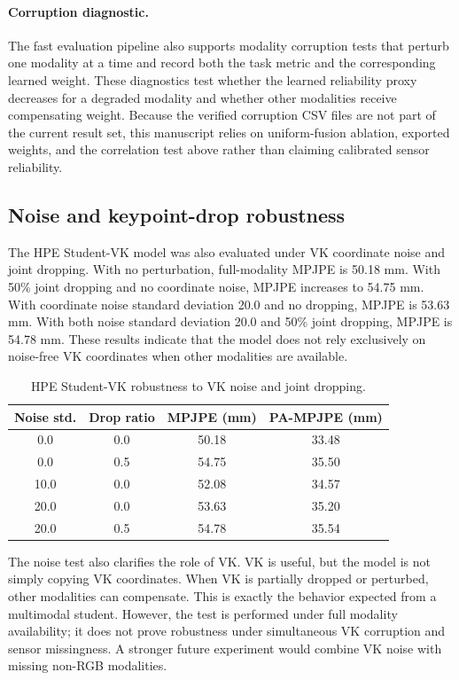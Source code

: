 \documentclass[preprint,12pt]{elsarticle}
\newcommand{\mpjpe}{MPJPE}
\newcommand{\pampjpe}{PA-MPJPE}
\begin{document}
\paragraph{Corruption diagnostic.}
The fast evaluation pipeline also supports modality corruption tests that perturb one modality at a time and record both the task metric and the corresponding learned weight. These diagnostics test whether the learned reliability proxy decreases for a degraded modality and whether other modalities receive compensating weight. Because the verified corruption CSV files are not part of the current result set, this manuscript relies on uniform-fusion ablation, exported weights, and the correlation test above rather than claiming calibrated sensor reliability.

\subsection{Noise and keypoint-drop robustness}

The HPE Student-VK model was also evaluated under VK coordinate noise and joint dropping. With no perturbation, full-modality \mpjpe{} is 50.18 mm. With 50\% joint dropping and no coordinate noise, \mpjpe{} increases to 54.75 mm. With coordinate noise standard deviation 20.0 and no dropping, \mpjpe{} is 53.63 mm. With both noise standard deviation 20.0 and 50\% joint dropping, \mpjpe{} is 54.78 mm. These results indicate that the model does not rely exclusively on noise-free VK coordinates when other modalities are available.

\begin{table}[t]
\centering
\caption{HPE Student-VK robustness to VK noise and joint dropping.}
\label{tab:noise}
\begin{tabular}{cccc}
\toprule
Noise std. & Drop ratio & \mpjpe{} (mm) & \pampjpe{} (mm) \\
\midrule
0.0 & 0.0 & 50.18 & 33.48 \\
0.0 & 0.5 & 54.75 & 35.50 \\
10.0 & 0.0 & 52.08 & 34.57 \\
20.0 & 0.0 & 53.63 & 35.20 \\
20.0 & 0.5 & 54.78 & 35.54 \\
\bottomrule
\end{tabular}
\end{table}

The noise test also clarifies the role of VK. VK is useful, but the model is not simply copying VK coordinates. When VK is partially dropped or perturbed, other modalities can compensate. This is exactly the behavior expected from a multimodal student. However, the test is performed under full modality availability; it does not prove robustness under simultaneous VK corruption and sensor missingness. A stronger future experiment would combine VK noise with missing non-RGB modalities.
\end{document}

